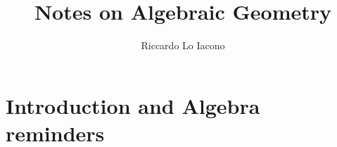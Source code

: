 \documentclass[draft, moon]{lectures2}
\title{Notes on Algebraic Geometry}
\author{Riccardo Lo Iacono}
\begin{document}
    \maketitle

    \section{Introduction and Algebra reminders}
    
\end{document}
